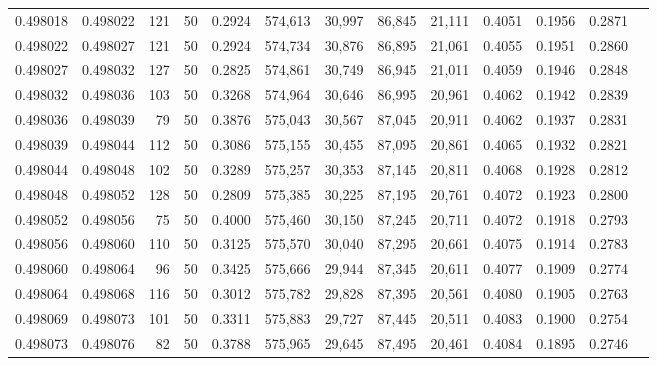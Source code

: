 \begin{tabular}{rrrrrrrrrrrrr}
0.498018 & 0.498022 &   121 &  50 &                                     0.2924 & 574,613 &  30,997 &  86,845 &  21,111 & 0.4051 & 0.1956 & 0.2871 \\
0.498022 & 0.498027 &   121 &  50 &                                     0.2924 & 574,734 &  30,876 &  86,895 &  21,061 & 0.4055 & 0.1951 & 0.2860 \\
0.498027 & 0.498032 &   127 &  50 &                                     0.2825 & 574,861 &  30,749 &  86,945 &  21,011 & 0.4059 & 0.1946 & 0.2848 \\
0.498032 & 0.498036 &   103 &  50 &                                     0.3268 & 574,964 &  30,646 &  86,995 &  20,961 & 0.4062 & 0.1942 & 0.2839 \\
0.498036 & 0.498039 &    79 &  50 &                                     0.3876 & 575,043 &  30,567 &  87,045 &  20,911 & 0.4062 & 0.1937 & 0.2831 \\
0.498039 & 0.498044 &   112 &  50 &                                     0.3086 & 575,155 &  30,455 &  87,095 &  20,861 & 0.4065 & 0.1932 & 0.2821 \\
0.498044 & 0.498048 &   102 &  50 &                                     0.3289 & 575,257 &  30,353 &  87,145 &  20,811 & 0.4068 & 0.1928 & 0.2812 \\
0.498048 & 0.498052 &   128 &  50 &                                     0.2809 & 575,385 &  30,225 &  87,195 &  20,761 & 0.4072 & 0.1923 & 0.2800 \\
0.498052 & 0.498056 &    75 &  50 &                                     0.4000 & 575,460 &  30,150 &  87,245 &  20,711 & 0.4072 & 0.1918 & 0.2793 \\
0.498056 & 0.498060 &   110 &  50 &                                     0.3125 & 575,570 &  30,040 &  87,295 &  20,661 & 0.4075 & 0.1914 & 0.2783 \\
0.498060 & 0.498064 &    96 &  50 &                                     0.3425 & 575,666 &  29,944 &  87,345 &  20,611 & 0.4077 & 0.1909 & 0.2774 \\
0.498064 & 0.498068 &   116 &  50 &                                     0.3012 & 575,782 &  29,828 &  87,395 &  20,561 & 0.4080 & 0.1905 & 0.2763 \\
0.498069 & 0.498073 &   101 &  50 &                                     0.3311 & 575,883 &  29,727 &  87,445 &  20,511 & 0.4083 & 0.1900 & 0.2754 \\
0.498073 & 0.498076 &    82 &  50 &                                     0.3788 & 575,965 &  29,645 &  87,495 &  20,461 & 0.4084 & 0.1895 & 0.2746 \\

\end{tabular}
